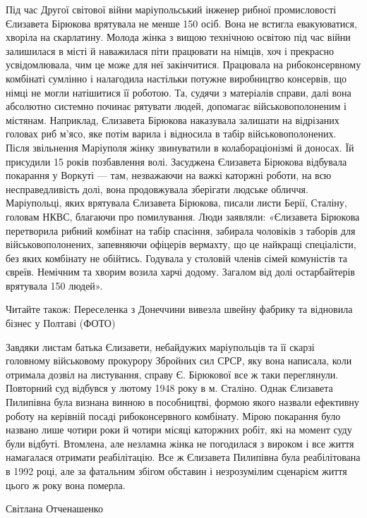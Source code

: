Під час Другої світової війни маріупольський інженер рибної промисловості
Єлизавета Бірюкова врятувала не менше 150 осіб. Вона не встигла евакуюватися,
хворіла на скарлатину. Молода жінка з вищою технічною освітою під час війни
залишилася в місті й наважилася піти працювати на німців, хоч і прекрасно
усвідомлювала, чим це може для неї закінчитися. Працювала на рибоконсервному
комбінаті сумлінно і налагодила настільки потужне виробництво консервів, що
німці не могли натішитися її роботою. Та, судячи з матеріалів справи, далі вона
абсолютно системно починає рятувати людей, допомагає військовополоненим і
містянам. Наприклад, Єлизавета Бірюкова наказувала залишати на відрізаних
головах риб м'ясо, яке потім варила і відносила в табір військовополонених.
Після звільнення Маріуполя жінку звинуватили в колабораціонізмі й доносах. Їй
присудили 15 років позбавлення волі. Засуджена Єлизавета Бірюкова відбувала
покарання у Воркуті — там, незважаючи на важкі каторжні роботи, на всю
несправедливість долі, вона продовжувала зберігати людське обличчя.
Маріупольці, яких врятувала Єлизавета Бірюкова, писали листи Берії, Сталіну,
головам НКВС, благаючи про помилування. Люди заявляли: «Єлизавета Бірюкова
перетворила рибний комбінат на табір спасіння, забирала чоловіків з таборів для
військовополонених, запевняючи офіцерів вермахту, що це найкращі спеціалісти,
без яких комбінату не обійтись. Годувала у столовій членів сімей комуністів та
євреїв. Немічним та хворим возила харчі додому. Загалом від долі остарбайтерів
врятувала 150 людей».

Читайте також: Переселенка з Донеччини вивезла швейну фабрику та відновила
бізнес у Полтаві (ФОТО)

Завдяки листам батька Єлизавети, небайдужих маріупольців та її скарзі головному
військовому прокурору Збройних сил СРСР, яку вона написала, коли отримала
дозвіл на листування, справу Є. Бірюкової все ж таки переглянули. Повторний суд
відбувся у лютому 1948 року в м. Сталіно. Однак Єлизавета Пилипівна була
визнана винною в пособництві, формою якого назвали ефективну роботу на керівній
посаді рибоконсервного комбінату. Мірою покарання було названо лише чотири роки
й чотири місяці каторжних робіт, які на момент суду були відбуті. Втомлена, але
незламна жінка не погодилася з вироком і все життя намагалася отримати
реабілітацію. Все ж Єлизавета Пилипівна була реабілітована в 1992 році, але за
фатальним збігом обставин і незрозумілим сценарієм життя цього ж року вона
померла.

Світлана Отченашенко


